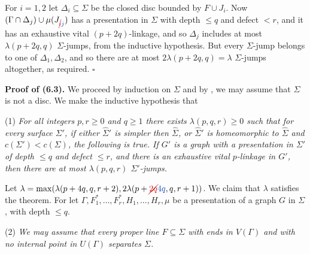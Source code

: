 For $i = 1, 2$ let $\Delta_i \subseteq \Sigma$ be the closed disc bounded by $F \cup J_i$. Now $(\Gamma \cap \Delta_j) \cup \mu(J_{\delm{i}\fix{j}})$ has a presentation in $\Sigma$ with depth $\le q$ and defect $< r$, and it has an exhaustive vital $(p + 2q)$-linkage, and so $\Delta_j$ includes at most $\lambda(p + 2q, q)$ $\Sigma$-jumps, from the inductive hypothesis. But every $\Sigma$-jump belongs to one of $\Delta_1, \Delta_2$, and so there are at most $2\lambda(p + 2q, q) = \lambda$ $\Sigma$-jumps altogether, as required. $\square$

\textbf{Proof of (6.3).} We proceed by induction on $\Sigma$ and by , we may assume that $\Sigma$ is not a disc. We make the inductive hypothesis that

\hspace*{12pt}(1) \textit{For all integers $p, r \ge 0$ and $q \ge 1$ there exists $\lambda(p, q, r) \ge 0$ such that for every surface $\Sigma'$, if either $\hat{\Sigma}'$ is simpler then $\hat{\Sigma}$, or $\hat{\Sigma}'$ is homeomorphic to $\hat{\Sigma}$ and $c(\Sigma') < c(\Sigma)$, the following is true. If $G'$ is a graph with a presentation in $\Sigma'$ of depth $\le q$ and defect $\le r$, and there is an exhaustive vital $p$-linkage in $G'$, then there are at most $\lambda(p, q, r)$ $\Sigma'$-jumps.}

Let $\lambda = \max(\lambda(p + 4q, q, r + 2), 2\lambda(p + \delm{2q}\fix{4q}, q, r + 1))$. We claim that $\lambda$ satisfies the theorem. For let $\Gamma, F_1^*, \dots, F_r^*, H_1, \dots, H_r, \mu$ be a presentation of a graph $G$ in $\Sigma$, with depth $\le q$.

\hspace*{12pt}(2) \textit{We may assume that every proper line $F \subseteq \Sigma$ with ends in $V(\Gamma)$ and with no internal point in $U(\Gamma)$ separates $\Sigma$.}

